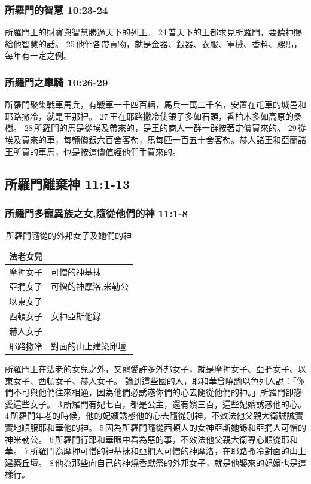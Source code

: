 \subsubsection{所羅門的智慧 10:23-24}
所羅門王的財寶與智慧勝過天下的列王。 24 普天下的王都求見所羅門，要聽神賜給他智慧的話。 25 他們各帶貢物，就是金器、銀器、衣服、軍械、香料、騾馬，每年有一定之例。

\subsubsection{所羅門之車騎 10:26-29}
所羅門聚集戰車馬兵，有戰車一千四百輛，馬兵一萬二千名，安置在屯車的城邑和耶路撒冷，就是王那裡。 27 王在耶路撒冷使銀子多如石頭，香柏木多如高原的桑樹。 28 所羅門的馬是從埃及帶來的，是王的商人一群一群按著定價買來的。 29 從埃及買來的車，每輛價銀六百舍客勒，馬每匹一百五十舍客勒。赫人諸王和亞蘭諸王所買的車馬，也是按這價值經他們手買來的。

\subsection{所羅門離棄神 11:1-13 }


\subsubsection{所羅門多寵異族之女,隨從他們的神 11:1-8}
\begin{table}
\centering 
\begin{tabular}{p{1.5cm}|p{3.5cm}}\hline\hline
法老女兒&\\\hline
摩押女子&可憎的神基抹\\\hline
亞捫女子&可憎的神摩洛,米勒公\\\hline
以東女子&\\\hline
西頓女子&女神亞斯他錄\\\hline
赫人女子&\\\hline
耶路撒冷&對面的山上建築邱壇\\\hline
\end{tabular}
\caption{所羅門隨從的外邦女子及她們的神}
\end{table}
所羅門王在法老的女兒之外，又寵愛許多外邦女子，就是摩押女子、亞捫女子、以東女子、西頓女子、赫人女子。
論到這些國的人，耶和華曾曉諭以色列人說：「你們不可與他們往來相通，因為他們必誘惑你們的心去隨從他們的神。」所羅門卻戀愛這些女子。 3 所羅門有妃七百，都是公主，還有嬪三百，這些妃嬪誘惑他的心。 4 所羅門年老的時候，他的妃嬪誘惑他的心去隨從別神，不效法他父親大衛誠誠實實地順服耶和華他的神。 5 因為所羅門隨從西頓人的女神亞斯她錄和亞捫人可憎的神米勒公。 6 所羅門行耶和華眼中看為惡的事，不效法他父親大衛專心順從耶和華。 7 所羅門為摩押可憎的神基抹和亞捫人可憎的神摩洛，在耶路撒冷對面的山上建築丘壇。 8 他為那些向自己的神燒香獻祭的外邦女子，就是他娶來的妃嬪也是這樣行。


